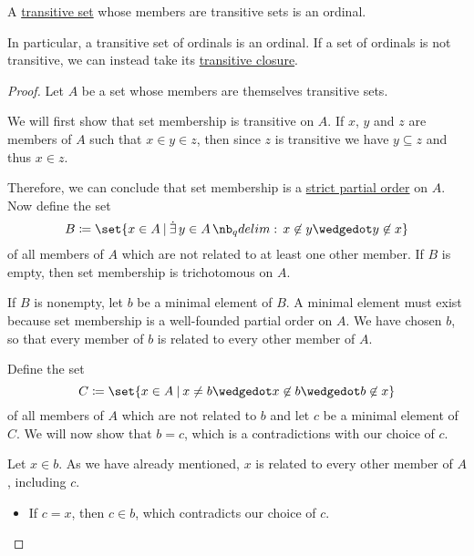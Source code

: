 \begin{proposition}\label{thm:transitive_set_of_transitive_sets}
  A \hyperref[def:transitive_set]{transitive set} whose members are transitive sets is an ordinal.

  In particular, a transitive set of ordinals is an ordinal. If a set of ordinals is not transitive, we can instead take its \hyperref[def:transitive_closure_of_a_set]{transitive closure}.
\end{proposition}
\begin{proof}
  Let \( A \) be a set whose members are themselves transitive sets.

  We will first show that set membership is transitive on \( A \). If \( x \), \( y \) and \( z \) are members of \( A \) such that \( x \in y \in z \), then since \( z \) is transitive we have \( y \subseteq z \) and thus \( x \in z \).

  Therefore, we can conclude that set membership is a \hyperref[def:strict_partial_order]{strict partial order} on \( A \). Now define the set
  \begin{equation*}
    B \coloneqq \set{ x \in A \given \qexists {y \in A} x \not\in y \synwedge y \not\in x }
  \end{equation*}
  of all members of \( A \) which are not related to at least one other member. If \( B \) is empty, then set membership is trichotomous on \( A \).

  If \( B \) is nonempty, let \( b \) be a minimal element of \( B \). A minimal element must exist because set membership is a well-founded partial order on \( A \). We have chosen \( b \), so that every member of \( b \) is related to every other member of \( A \).

  Define the set
  \begin{equation*}
    C \coloneqq \set{ x \in A \given x \neq b \synwedge x \not\in b \synwedge b \not\in x }
  \end{equation*}
  of all members of \( A \) which are not related to \( b \) and let \( c \) be a minimal element of \( C \). We will now show that \( b = c \), which is a contradictions with our choice of \( c \).

  Let \( x \in b \). As we have already mentioned, \( x \) is related to every other member of \( A \), including \( c \).
  \begin{itemize}
    \item If \( c = x \), then \( c \in b \), which contradicts our choice of \( c \).


\end{itemize}
\end{proof}
